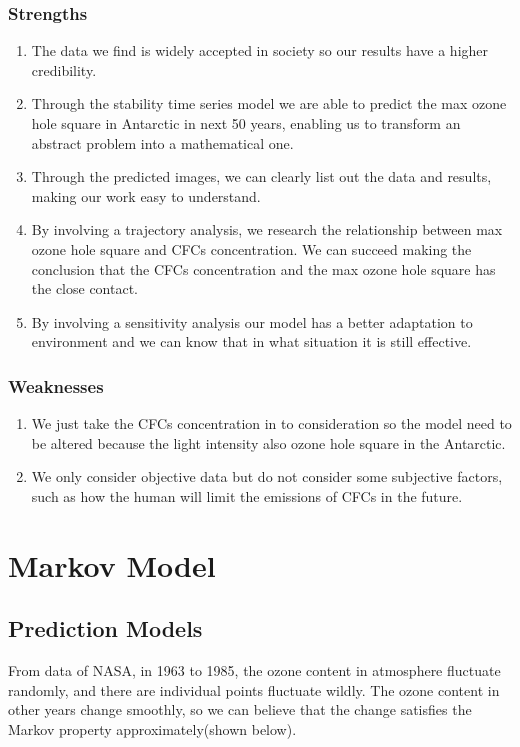 \documentclass[12pt]{article}
\begin{document}
\subsubsection{Strengths}
\begin{enumerate}
\item The data we find is widely accepted in society so our results have a higher credibility.
\item Through the stability time series model we are able to predict the max ozone hole square in Antarctic in next 50 years, enabling us to transform an abstract problem into a mathematical one.
\item Through the predicted images, we can clearly list out the data and results, making our work easy to understand.
\item By involving a trajectory analysis, we research the relationship between max ozone hole square and CFCs concentration. We can succeed making the conclusion that the CFCs concentration and the max ozone hole square has the close contact.
\item By involving a sensitivity analysis our model has a better adaptation to environment and we can know that in what situation it is still effective.
\end{enumerate}
\subsubsection{Weaknesses}
\begin{enumerate}
\item We just take the CFCs concentration in to consideration so the model need to be altered because the light intensity also ozone hole square in the Antarctic.
\item We only consider objective data but do not consider some subjective factors, such as how the human will limit the emissions of CFCs in the future.
\end{enumerate}


\section{Markov Model}
\subsection{Prediction Models}
From data of NASA, in 1963 to 1985, the ozone content in atmosphere fluctuate randomly, and there are individual points fluctuate wildly. The ozone content in other years change smoothly, so we can believe that the change satisfies the Markov property approximately(shown below).
\end{document}
